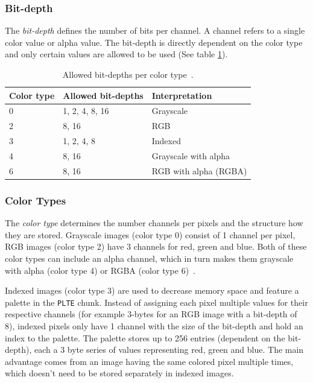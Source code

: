 \documentclass[runningheads]{llncs}
\begin{document}
\subsubsection{Bit-depth}
The \textit{bit-depth} defines the number of bits per channel. A channel refers to a single color value or alpha value.
The bit-depth is directly dependent on the color type and only certain values are allowed to be used (See table \ref{tab2}).

\bgroup
\def\arraystretch{1.5}
\setlength\tabcolsep{1.5ex}
    \begin{table}[]
        \caption{Allowed bit-depths per color type~\cite{libpng_chunks}.}
        \label{tab2}
        \begin{center}
            \begin{tabular}{|l|l|l|}
            \hline
            \textbf{Color type} & \textbf{Allowed bit-depths} & \textbf{Interpretation} \\ \hline \hline 
            0                   & 1, 2, 4, 8, 16              & Grayscale               \\ \hline
            2                   & 8, 16                       & RGB                     \\ \hline
            3                   & 1, 2, 4, 8                  & Indexed                 \\ \hline
            4                   & 8, 16                       & Grayscale with alpha    \\ \hline
            6                   & 8, 16                       & RGB with alpha (RGBA)   \\ \hline
            \end{tabular}
        \end{center}
    \end{table}
\egroup

\subsubsection{Color Types}
The \textit{color type} determines the number channels per pixels and the structure how they are stored. Grayscale images (color type 0) consist of 1 channel per pixel, RGB images (color type 2) have 3 channels for red, green and blue. 
Both of these color types can include an alpha channel, which in turn makes them grayscale with alpha (color type 4) or RGBA (color type 6)~\cite{libpng_data_representation}.

Indexed images (color type 3) are used to decrease memory space and feature a palette in the \texttt{PLTE} chunk.
Instead of assigning each pixel multiple values for their respective channels (for example 3-bytes for an RGB image with a bit-depth of 8), indexed pixels only have 1 channel with the size of the bit-depth and hold an index to the palette.
The palette stores up to 256 entries (dependent on the bit-depth), each a 3 byte series of values representing red, green and blue. The main advantage comes from an image having the same colored pixel multiple times, which doesn't need to be stored separately in indexed images.
\end{document}

